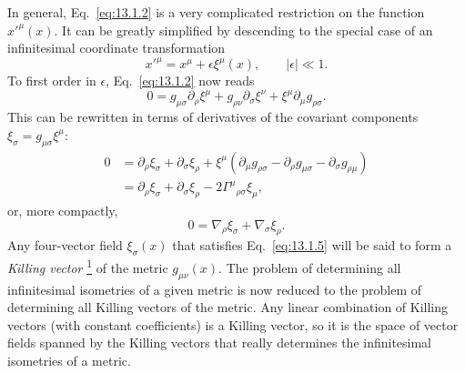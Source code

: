 In general, Eq.~\eqref{eq:13.1.2} is a very complicated restriction on the
function \(x'^\mu(x)\). It can be greatly simplified by descending to the
special case of an infinitesimal coordinate transformation
\begin{equation}
  x'^\mu=x^\mu+\epsilon\xi^\mu(x),
  \qquad \lvert\epsilon\rvert\ll1.
  \tag{13.1.3}\label{eq:13.1.3}
\end{equation}
To first order in \(\epsilon\), Eq.~\eqref{eq:13.1.2} now reads
\begin{equation}
  0
  =
  g_{\mu\sigma}\partial_\rho\xi^\mu
  +
  g_{\rho\nu}\partial_\sigma\xi^\nu
  +
  \xi^\mu\partial_\mu g_{\rho\sigma}.
  \tag{13.1.4}\label{eq:13.1.4}
\end{equation}
This can be rewritten in terms of derivatives of the covariant components
\(\xi_\sigma=g_{\mu\sigma}\xi^\mu\):
\begin{align*}
  0
  &=
  \partial_\rho\xi_\sigma+\partial_\sigma\xi_\rho
  +\xi^\mu
  \left(
    \partial_\mu g_{\rho\sigma}
    -\partial_\rho g_{\mu\sigma}
    -\partial_\sigma g_{\rho\mu}
  \right)
  \\
  &=
  \partial_\rho\xi_\sigma+\partial_\sigma\xi_\rho
  -2\Gamma^\mu{}_{\rho\sigma}\xi_\mu,
\end{align*}
or, more compactly,
\begin{equation}
  0=\nabla_\rho\xi_\sigma+\nabla_\sigma\xi_\rho.
  \tag{13.1.5}\label{eq:13.1.5}
\end{equation}
Any four-vector field \(\xi_\sigma(x)\) that satisfies
Eq.~\eqref{eq:13.1.5} will be said to form a \emph{Killing vector}%
\hyperref[ch13-ref-1]{\textsuperscript{1}} of the metric
\(g_{\mu\nu}(x)\). The problem of determining all infinitesimal isometries
of a given metric is now reduced to the problem of determining all Killing
vectors of the metric. Any linear combination of Killing vectors (with
constant coefficients) is a Killing vector, so it is the space of vector
fields spanned by the Killing vectors that really determines the
infinitesimal isometries of a metric.

